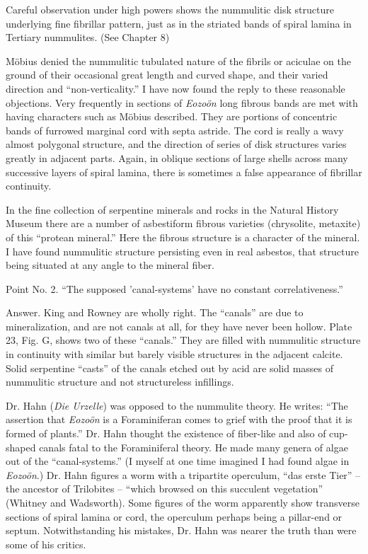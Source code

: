 \documentclass[a4paper, 12pt, oneside]{article}
\begin{document}
Careful observation under high powers shows the nummulitic disk structure underlying fine fibrillar pattern, just as in the striated bands of spiral lamina in Tertiary nummulites. (See Chapter 8)

Möbius denied the nummulitic tubulated nature of the fibrils or aciculae on the ground of their occasional great length and curved shape, and their varied direction and ``non-verticality.'' I have now found the reply to these reasonable objections. Very frequently in sections of \emph{Eozoön} long fibrous bands are met with having characters such as Möbius described. They are portions of concentric bands of furrowed marginal cord with septa astride. The cord is really a wavy almost polygonal structure, and the direction of series of disk structures varies greatly in adjacent parts. Again, in oblique sections of large shells across many successive layers of spiral lamina, there is sometimes a false appearance of fibrillar continuity.

In the fine collection of serpentine minerals and rocks in the Natural History Museum there are a number of asbestiform fibrous varieties (chrysolite, metaxite) of this ``protean mineral.'' Here the fibrous structure is a character of the mineral. I have found nummulitic structure persisting even in real asbestos, that structure being situated at any angle to the mineral fiber.

Point No. 2. ``The supposed 'canal-systems' have no constant correlativeness.''

Answer. King and Rowney are wholly right. The ``canals'' are due to mineralization, and are not canals at all, for they have never been hollow. Plate 23, Fig. G, shows two of these ``canals.'' They are filled with nummulitic structure in continuity with similar but barely visible structures in the adjacent calcite. Solid serpentine ``casts'' of the canals etched out by acid are solid masses of nummulitic structure and not structureless infillings.

Dr. Hahn (\emph{Die Urzelle}) was opposed to the nummulite theory. He writes: ``The assertion that \emph{Eozoön} is a Foraminiferan comes to grief with the proof that it is formed of plants.'' Dr. Hahn thought the existence of fiber-like and also of cup-shaped canals fatal to the Foraminiferal theory. He made many genera of algae out of the ``canal-systems.'' (I myself at one time imagined I had found algae in \emph{Eozoön}.) Dr. Hahn figures a worm with a tripartite operculum, ``das erste Tier'' -- the ancestor of Trilobites -- ``which browsed on this succulent vegetation'' (Whitney and Wadsworth). Some figures of the worm apparently show transverse sections of spiral lamina or cord, the operculum perhaps being a pillar-end or septum. Notwithstanding his mistakes, Dr. Hahn was nearer the truth than were some of his critics.
\end{document}
